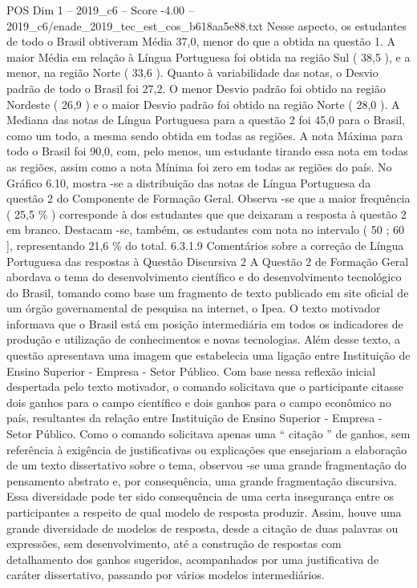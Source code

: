\begin{textsample}{POS Dim 1 – 2019\_c6 – Score -4.00 – 2019\_c6/enade\_2019\_tec\_est\_cos\_b618aa5e88.txt}
Nesse aspecto, os estudantes de todo o Brasil obtiveram Média 37,0, menor do que a obtida na questão 1.
A maior Média em relação à Língua Portuguesa foi obtida na região Sul ( 38,5 ), e a menor, na região Norte ( 33,6 ).
Quanto à variabilidade das notas, o Desvio padrão de todo o Brasil foi 27,2.
O menor Desvio padrão foi obtido na região Nordeste ( 26,9 ) e o maior Desvio padrão foi obtido na região Norte ( 28,0 ).
A Mediana das notas de Língua Portuguesa para a questão 2 foi 45,0 para o Brasil, como um todo, a mesma sendo obtida em todas as regiões.
A nota Máxima para todo o Brasil foi 90,0, com, pelo menos, um estudante tirando essa nota em todas as regiões, assim como a nota Mínima foi zero em todas as regiões do país.
No Gráfico 6.10, mostra -se a distribuição das notas de Língua Portuguesa da questão 2 do Componente de Formação Geral.
Observa -se que a maior frequência ( 25,5 \% ) corresponde à dos estudantes que que deixaram a resposta à questão 2 em branco.
Destacam -se, também, os estudantes com nota no intervalo ( 50 ; 60 ], representando 21,6 \% do total. 6.3.1.9 Comentários sobre a correção de Língua Portuguesa das respostas à Questão Discursiva 2 A Questão 2 de Formação Geral abordava o tema do desenvolvimento científico e do desenvolvimento tecnológico do Brasil, tomando como base um fragmento de texto publicado em site oficial de um órgão governamental de pesquisa na internet, o Ipea.
O texto motivador informava que o Brasil está em posição intermediária em todos os indicadores de produção e utilização de conhecimentos e novas tecnologias.
Além desse texto, a questão apresentava uma imagem que estabelecia uma ligação entre Instituição de Ensino Superior - Empresa - Setor Público.
Com base nessa reflexão inicial despertada pelo texto motivador, o comando solicitava que o participante citasse dois ganhos para o campo científico e dois ganhos para o campo econômico no país, resultantes da relação entre Instituição de Ensino Superior - Empresa - Setor Público.
Como o comando solicitava apenas uma “ citação ” de ganhos, sem referência à exigência de justificativas ou explicações que ensejariam a elaboração de um texto dissertativo sobre o tema, observou -se uma grande fragmentação do pensamento abstrato e, por consequência, uma grande fragmentação discursiva.
Essa diversidade pode ter sido consequência de uma certa insegurança entre os participantes a respeito de qual modelo de resposta produzir.
Assim, houve uma grande diversidade de modelos de resposta, desde a citação de duas palavras ou expressões, sem desenvolvimento, até a construção de respostas com detalhamento dos ganhos sugeridos, acompanhados por uma justificativa de caráter dissertativo, passando por vários modelos intermediários.

\end{textsample}

